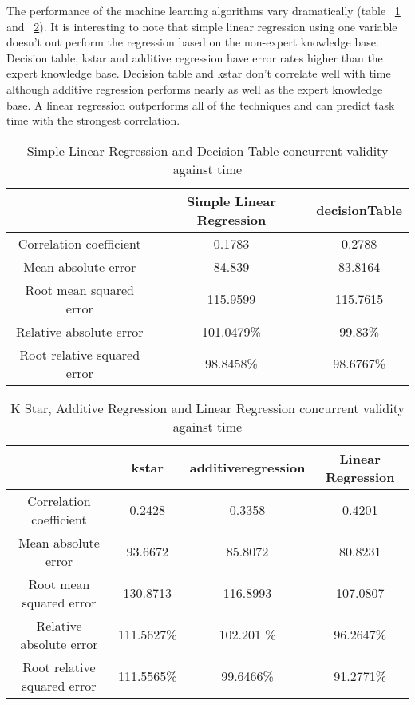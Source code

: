 The performance of the machine learning algorithms vary dramatically (table ~\ref{tab:ml1currenttime} and ~\ref{tab:ml2currenttime}). It is interesting to note that simple linear regression using one variable doesn't out perform the regression based on the non-expert knowledge base. Decision table, kstar and additive regression have error rates higher than the expert knowledge base. Decision table and kstar don't correlate well with time although additive regression performs nearly as well as the expert knowledge base. A linear regression outperforms all of the techniques and can predict task time with the strongest correlation.

\begin{table}[!h]
\centering
\begin{tabular}{|c|c|c|}
                            & Simple Linear Regression   & decisionTable\\ \hline
Correlation coefficient     & 0.1783        & 0.2788    \\
Mean absolute error         & 84.839        & 83.8164   \\
Root mean squared error     & 115.9599      & 115.7615  \\
Relative absolute error     & 101.0479\%    & 99.83\%   \\
Root relative squared error & 98.8458\%     & 98.6767\% \\
\end{tabular}
\caption{Simple Linear Regression and Decision Table concurrent validity against time}
\label{tab:ml1currenttime}
\end{table}

\begin{table}[!h]
\centering
\begin{tabular}{|c|c|c|c|}
                            & kstar & additiveregression & Linear Regression\\ \hline
Correlation coefficient     &  0.2428       & 0.3358    & 0.4201 \\
Mean absolute error         &  93.6672      & 85.8072   & 80.8231 \\
Root mean squared error     &  130.8713     & 116.8993  & 107.0807  \\
Relative absolute error     & 111.5627\%   & 102.201 \% & 96.2647\%\\
Root relative squared error &  111.5565\%   & 99.6466\%  & 91.2771\%\\
\end{tabular}
\caption{K Star, Additive Regression and Linear Regression concurrent validity against time}
\label{tab:ml2currenttime}
\end{table}

